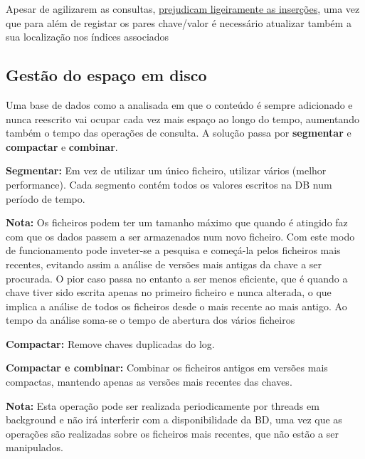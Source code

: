 \documentclass{article}
\begin{document}
Apesar de agilizarem as consultas, \uline{prejudicam ligeiramente as inserções}, uma vez que para
além de registar os pares chave/valor é necessário atualizar também a sua localização nos
índices associados

\pagebreak

\subsection{Gestão do espaço em disco}

Uma base de dados como a analisada em que o conteúdo é sempre adicionado e nunca
reescrito vai ocupar cada vez mais espaço ao longo do tempo, aumentando também o tempo
das operações de consulta. A solução passa por \textbf{segmentar} e \textbf{compactar} e \textbf{combinar}.

\begin{flushleft}
  \textbf{Segmentar:} Em vez de utilizar um único ficheiro, utilizar vários (melhor performance).
  Cada segmento contém todos os valores escritos na DB num período de tempo.

  \vspace{2mm}

  \textbf{Nota: } Os ficheiros podem ter um tamanho máximo que quando é atingido faz com que os dados passem a ser armazenados
  num novo ficheiro. Com este modo de funcionamento pode inveter-se a pesquisa e começá-la pelos ficheiros mais
  recentes, evitando assim a análise de versões mais antigas da chave a ser procurada.
  O pior caso passa no entanto a ser menos eficiente, que é quando a chave tiver sido escrita apenas no primeiro ficheiro
  e nunca alterada, o que implica a análise de todos os ficheiros desde o mais recente ao mais antigo. Ao tempo da
  análise soma-se o tempo de abertura dos vários ficheiros

  \vspace{2mm}

  \textbf{Compactar:} Remove chaves duplicadas do log.

  \vspace{2mm}

  \textbf{Compactar e combinar:} Combinar os ficheiros antigos em versões mais compactas,
  mantendo apenas as versões mais recentes das chaves.

  \vspace{2mm}

  \textbf{Nota:} Esta operação pode ser realizada periodicamente por
  threads em background e não irá interferir com a
  disponibilidade da BD, uma vez que as operações são realizadas sobre os ficheiros mais recentes,
  que não estão a ser manipulados.


\end{flushleft}
\end{document}
